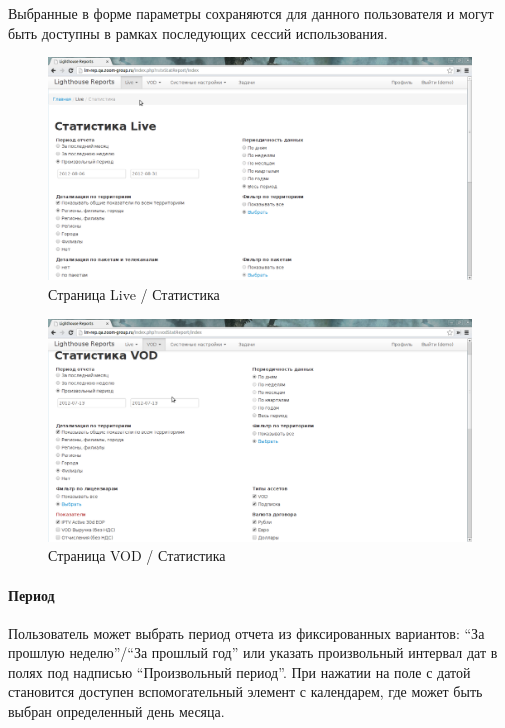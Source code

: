 Выбранные в форме параметры сохраняются для данного пользователя и могут быть
доступны в рамках последующих сессий использования.

\begin{figure}[!ht]
\begin{center}
\hspace*{-1cm} \includegraphics[scale=0.35, trim=0mm 0mm 180mm 10mm, clip]{../resources/screens/live_stat.png}
\caption{Страница Live / Статистика}
\end{center}
\end{figure}

\begin{figure}[!ht]
\begin{center}
\hspace*{-1cm} \includegraphics[scale=0.35, trim=0mm 0mm 180mm 10mm, clip]{../resources/screens/vod_stat.png}
\caption{Страница VOD / Статистика}
\end{center}
\end{figure}

\paragraph{Период}
Пользователь может выбрать период отчета из фиксированных вариантов: ``За прошлую неделю''/``За прошлый год''
или указать произвольный интервал дат в полях под надписью ``Произвольный период''.
При нажатии на поле с датой становится доступен вспомогательный элемент с календарем, где может быть
выбран определенный день месяца.


